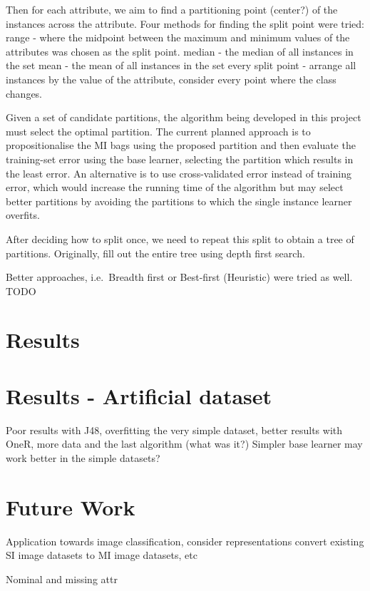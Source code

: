 \documentclass[a4paper,12pt]{article} %
\begin{document}
Then for each attribute, we aim to find a partitioning point (center?) of the instances across the attribute.
Four methods for finding the split point were tried: 
    range - where the midpoint between the maximum and minimum values of the attributes was chosen as the 
        split point.
    median - the median of all instances in the set
    mean - the mean of all instances in the set
    every split point - arrange all instances by the value of the attribute, consider every point where     
        the class changes.

Given a set of candidate partitions, the algorithm being developed in this project must select the optimal partition. 
The current planned approach is to propositionalise the MI bags using the proposed partition and then evaluate the training-set error using the base learner, selecting the partition which results in the least error. An alternative is to use cross-validated error instead of training error, which would increase the running time of the algorithm but may select better partitions by avoiding the partitions to which the single instance learner overfits.


After deciding how to split once, we need to repeat this split to obtain a tree of partitions.
Originally, fill out the entire tree using depth first search.

Better approaches, i.e.\ Breadth first or Best-first (Heuristic) were tried as well. TODO


\section{Results}

\section{Results - Artificial dataset}

Poor results with J48, overfitting the very simple dataset, better results with 
    OneR, more data and the last algorithm (what was it?)
Simpler base learner may work better in the simple datasets?


\section{Future Work}
Application towards image classification, consider representations
    convert existing SI image datasets to MI image datasets, etc

Nominal and missing attr
\end{document}

